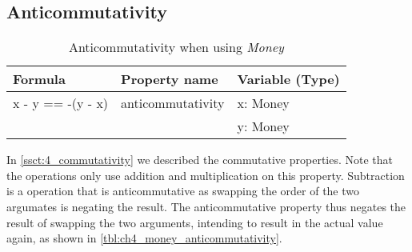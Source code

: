 \subsection*{Anticommutativity}
\FloatBarrier
\begin{table}[!ht]
\centering
\begin{tabular}{lll}
\hline
                        \textbf{Formula}  & \textbf{Property name} & \textbf{Variable (Type)} \\ \hline
\rowcolor[HTML]{EFEFEF} x - y == -(y - x) & anticommutativity      & x: Money                 \\
\rowcolor[HTML]{EFEFEF}                   &                        & y: Money                 \\ \hline
\end{tabular}
\caption{Anticommutativity when using \textit{Money}}
\label{tbl:ch4_money_anticommutativity}
\end{table}
\FloatBarrier
In \autoref{ssct:4_commutativity} we described the commutative properties. Note that the operations only use addition and multiplication on this property. Subtraction is a operation that is anticommutative as swapping the order of the two argumates is negating the result. The anticommutative property thus negates the result of swapping the two arguments, intending to result in the actual value again, as shown in \autoref{tbl:ch4_money_anticommutativity}.

